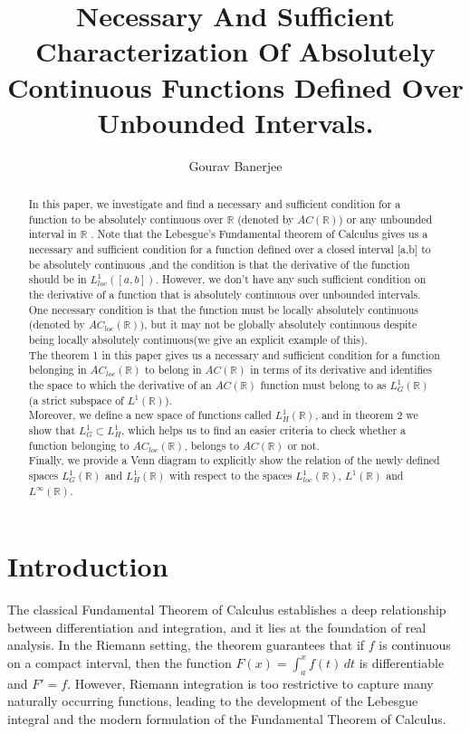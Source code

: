 \documentclass{article}
\title{Necessary And Sufficient Characterization Of Absolutely Continuous Functions Defined Over Unbounded Intervals.}
\author{Gourav Banerjee}
\numberwithin{equation}{section}
{\theoremstyle{break}\newtheorem{theorem}{Theorem}[subsection]}
{\theoremstyle{break}\theorembodyfont{\rmfamily}\newtheorem{example}[theorem]{Example}}
{\theoremstyle{break}\theorembodyfont{\rmfamily}\newtheorem{definition}[theorem]{Definition}}
{\theoremstyle{break}\theorembodyfont{\rmfamily}\newtheorem{notation}[theorem]{Notation}}
{\theoremstyle{break}\theorembodyfont{\rmfamily}\newtheorem{remark}[theorem]{Remark}}
\begin{document}
\maketitle

\begin{abstract}
In this paper, we investigate and find a necessary and sufficient condition for a function to be absolutely continuous over $\mathbb{R}$ (denoted by $AC(\mathbb{R})$) or any unbounded interval in $\mathbb{R}$ . Note that the Lebesgue's Fundamental theorem of Calculus gives us a necessary and sufficient condition\cite{book:B} for a function defined over a closed interval [a,b] to be absolutely continuous ,and the condition is that the derivative of the function should be in $L^1_{loc}([a,b])$. However, we don't have any such sufficient condition on the derivative of a function that is absolutely continuous over unbounded intervals.
One necessary condition is that the function must be locally absolutely continuous (denoted by $AC_{loc}(\mathbb{R})$), but it may not be globally absolutely continuous despite being locally absolutely continuous(we give an explicit example of this).
\\
The theorem 1 in this paper gives us a necessary and sufficient condition for a function belonging in $AC_{loc}(\mathbb{R})$ to belong in $AC(\mathbb{R})$ in terms of its derivative and identifies the space to which the derivative of an $AC(\mathbb{R})$ function must belong to as $L^1_{G}(\mathbb{R})$ (a strict subspace of $L^1(\mathbb{R})$).
\\
Moreover, we define a new space of functions called $L^1_{H}(\mathbb{R})$, and in theorem 2 we show that $L^1_G \subset L^1_H$, which helps us to find an easier criteria to check whether a function belonging to $AC_{loc}(\mathbb{R})$, belongs to $AC(\mathbb{R})$ or not.
\\
Finally, we provide a Venn diagram to explicitly show the relation of the newly defined spaces $L^1_{G}(\mathbb{R})$ and $L^1_{H}(\mathbb{R})$ with respect to the spaces $L^1_{loc}(\mathbb{R})$, $L^1(\mathbb{R})$ and $L^\infty(\mathbb{R})$.    
\end{abstract}

\tableofcontents

\section{Introduction}

The classical Fundamental Theorem of Calculus establishes a deep relationship between
differentiation and integration, and it lies at the foundation of real analysis. In the
Riemann setting, the theorem guarantees that if $f$ is continuous on a compact interval,
then the function $F(x) = \int_a^x f(t)\, dt$ is differentiable and $F' = f$. However,
Riemann integration is too restrictive to capture many naturally occurring functions,
leading to the development of the Lebesgue integral and the modern formulation of the
Fundamental Theorem of Calculus.
\end{document}
